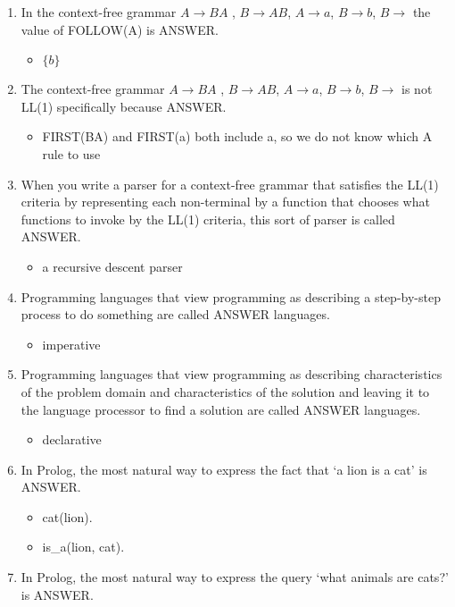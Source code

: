 \documentclass{exam}
\begin{document}
\begin{enumerate}
\begin{itemize}
\end{itemize}
\item In the context-free grammar $A \rightarrow B A$ , $B \rightarrow A B$, $A \rightarrow a$, $B \rightarrow b$, $B \rightarrow$  the value of FOLLOW(A) is ANSWER.
\begin{itemize}
\item $\{b\}$
\end{itemize}
\item The context-free grammar $A \rightarrow B A$ , $B \rightarrow A B$, $A \rightarrow a$, $B \rightarrow b$, $B \rightarrow$  is not LL(1) specifically because ANSWER.
\begin{itemize}
\item FIRST(BA) and FIRST(a) both include a, so we do not know which A rule to use
\end{itemize}
\item When you write a parser for a context-free grammar that satisfies the LL(1) criteria by representing each non-terminal by a function that chooses what functions to invoke by the LL(1) criteria, this sort of parser is called ANSWER.
\begin{itemize}
\item a recursive descent parser
\end{itemize}
\item Programming languages that view programming as describing a step-by-step process to do something are called ANSWER languages.
\begin{itemize}
\item imperative
\end{itemize}
\item Programming languages that view programming as describing characteristics of the problem domain and characteristics of the solution and leaving it to the language processor to find a solution are called ANSWER languages.
\begin{itemize}
\item declarative
\end{itemize}
\item In Prolog, the most natural way to express the fact that `a lion is a cat' is ANSWER.
\begin{itemize}
\item cat(lion).
\item is\_a(lion, cat).
\end{itemize}
\item In Prolog, the most natural way to express the query `what animals are cats?' is ANSWER.

\end{enumerate}
\end{document}

